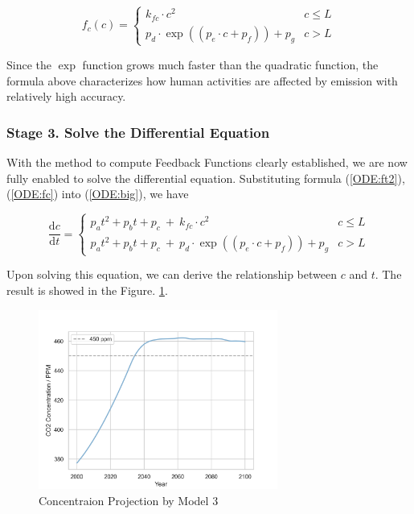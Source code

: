 \documentclass[12pt]{article}
\begin{document}
\begin{equation}
    \label{ODE:fc}
    f_c(c) = 
    \begin{cases}
        k_{fc} \cdot c^2 & c \le L\\
        p_{d} \cdot \exp((p_e \cdot c + p_f)) + p_g & c > L
    \end{cases}
\end{equation}

Since the $\exp$ function grows much faster than the quadratic function, the formula above characterizes how human activities are affected by  emission with relatively high accuracy.

\subsubsection{Stage 3. Solve the Differential Equation}

With the method to compute Feedback Functions clearly established, we are now fully enabled to solve the differential equation. Substituting formula (\ref{ODE:ft2}), (\ref{ODE:fc}) into (\ref{ODE:big}), we have

\begin{equation}
    \label{ODE:ODE}
    \frac{\mathrm{d}c}{\mathrm{d}t} =
    \begin{cases}
        p_a t^2 + p_b t + p_c \ + \ k_{fc} \cdot c^2 & c \le L\\
        p_a t^2 + p_b t + p_c \ + \ p_{d} \cdot \exp((p_e \cdot c + p_f)) + p_g & c > L
    \end{cases}
\end{equation}

Upon solving this equation, we can derive the relationship between $c$ and $t$. The result is showed in the Figure. \ref{m3:fig}.

\begin{figure}[hbt]
\centering
\includegraphics[width = 0.7\textwidth]{fig/ODE.png}
\caption{ Concentraion Projection by Model 3}
\label{m3:fig}
\end{figure}
\end{document}
